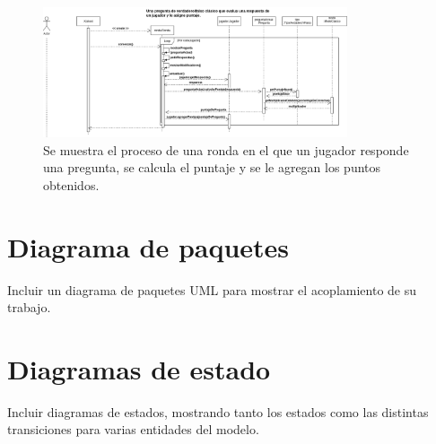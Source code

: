 \documentclass[titlepage,a4paper]{article}
\begin{document}
\begin{figure}[H]
\centering
\includegraphics[width=0.8\textwidth]{diagramaDeSecuencia.png}
\caption{\label{fig:seq01}Se muestra el proceso de una ronda en el que un jugador responde una pregunta, se calcula el puntaje y se le agregan los puntos obtenidos.}
\end{figure}

\section{Diagrama de paquetes}\label{sec:diagramasdepaquetes}

Incluir un diagrama de paquetes UML para mostrar el acoplamiento de su trabajo.

\section{Diagramas de estado}\label{sec:diagramasdeestados}

Incluir diagramas de estados, mostrando tanto los estados como las distintas transiciones para
varias entidades del modelo.
\end{document}
